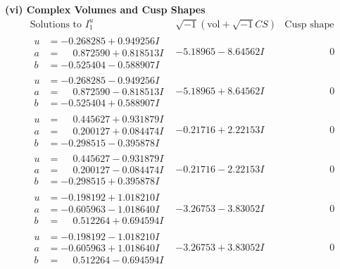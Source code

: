 \documentclass[1p]{elsarticle_modified}
\theoremstyle{definition}
\newcommand{\I}{\sqrt{-1}}
\begin{document}
\newpage\flushleft \textbf{(vi) Complex Volumes and Cusp Shapes}
$$\begin{array}{c|c|c}  
\text{Solutions to }I^u_{1}& \I (\text{vol} + \sqrt{-1}CS) & \text{Cusp shape}\\
 \hline 
\begin{aligned}
u &= -0.268285 + 0.949256 I \\
a &= \phantom{-}0.872590 + 0.818513 I \\
b &= -0.525404 - 0.588907 I\end{aligned}
 & -5.18965 - 8.64562 I & \phantom{-0.000000 } 0 \\ \hline\begin{aligned}
u &= -0.268285 - 0.949256 I \\
a &= \phantom{-}0.872590 - 0.818513 I \\
b &= -0.525404 + 0.588907 I\end{aligned}
 & -5.18965 + 8.64562 I & \phantom{-0.000000 } 0 \\ \hline\begin{aligned}
u &= \phantom{-}0.445627 + 0.931879 I \\
a &= \phantom{-}0.200127 + 0.084474 I \\
b &= -0.298515 - 0.395878 I\end{aligned}
 & -0.21716 + 2.22153 I & \phantom{-0.000000 } 0 \\ \hline\begin{aligned}
u &= \phantom{-}0.445627 - 0.931879 I \\
a &= \phantom{-}0.200127 - 0.084474 I \\
b &= -0.298515 + 0.395878 I\end{aligned}
 & -0.21716 - 2.22153 I & \phantom{-0.000000 } 0 \\ \hline\begin{aligned}
u &= -0.198192 + 1.018210 I \\
a &= -0.605963 - 1.018640 I \\
b &= \phantom{-}0.512264 + 0.694594 I\end{aligned}
 & -3.26753 - 3.83052 I & \phantom{-0.000000 } 0 \\ \hline\begin{aligned}
u &= -0.198192 - 1.018210 I \\
a &= -0.605963 + 1.018640 I \\
b &= \phantom{-}0.512264 - 0.694594 I\end{aligned}
 & -3.26753 + 3.83052 I & \phantom{-0.000000 } 0 \\ \hline\begin{aligned}

\end{aligned}
\end{array}$$
\end{document}
